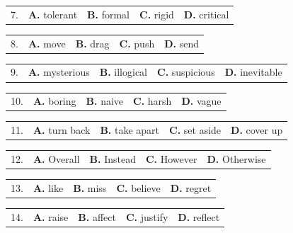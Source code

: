 \documentclass[UTF8,11pt]{ctexart}
\begin{document}
\noindent\begin{tabularx}{\linewidth}{@{}lXXXX@{}}7. & \textbf{A.} tolerant & \textbf{B.} formal & \textbf{C.} rigid & \textbf{D.} critical\\\end{tabularx}\par

\noindent\begin{tabularx}{\linewidth}{@{}lXXXX@{}}8. & \textbf{A.} move & \textbf{B.} drag & \textbf{C.} push & \textbf{D.} send\\\end{tabularx}\par

\noindent\begin{tabularx}{\linewidth}{@{}lXXXX@{}}9. & \textbf{A.} mysterious & \textbf{B.} illogical & \textbf{C.} suspicious & \textbf{D.} inevitable\\\end{tabularx}\par

\noindent\begin{tabularx}{\linewidth}{@{}lXXXX@{}}10. & \textbf{A.} boring & \textbf{B.} naive & \textbf{C.} harsh & \textbf{D.} vague\\\end{tabularx}\par

\noindent\begin{tabularx}{\linewidth}{@{}lXXXX@{}}11. & \textbf{A.} turn back & \textbf{B.} take apart & \textbf{C.} set aside & \textbf{D.} cover up\\\end{tabularx}\par

\noindent\begin{tabularx}{\linewidth}{@{}lXXXX@{}}12. & \textbf{A.} Overall & \textbf{B.} Instead & \textbf{C.} However & \textbf{D.} Otherwise\\\end{tabularx}\par

\noindent\begin{tabularx}{\linewidth}{@{}lXXXX@{}}13. & \textbf{A.} like & \textbf{B.} miss & \textbf{C.} believe & \textbf{D.} regret\\\end{tabularx}\par

\noindent\begin{tabularx}{\linewidth}{@{}lXXXX@{}}14. & \textbf{A.} raise & \textbf{B.} affect & \textbf{C.} justify & \textbf{D.} reflect\\\end{tabularx}\par
\end{document}
